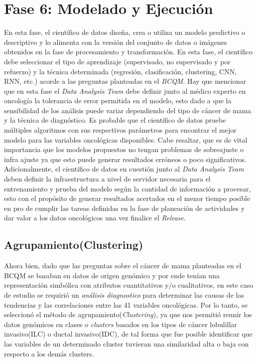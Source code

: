 \clearpage
\section{Fase 6: Modelado y Ejecución}
En esta fase, el científico de datos diseña, crea o utiliza un modelo predictivo o descriptivo y lo alimenta con la versión del conjunto de datos o imágenes obtenidos en la fase de procesamiento y transformación. En esta fase, el científico debe seleccionar el tipo de aprendizaje (supervisado, no supervisado y por refuerzo) y la técnica determinada (regresión, clasificación, clustering, CNN, RNN, etc.) acorde a las preguntas planteadas en el \textit{BCQM}. Hay que mencionar que en esta fase el \textit{Data Analysis Team} debe definir junto al médico experto en oncología la tolerancia de error permitida en el modelo, esto dado a que la sensibilidad de los análisis puede variar dependiendo del tipo de cáncer de mama y la técnica de diagnóstico. Es probable que el científico de datos pruebe múltiples algoritmos con sus respectivos parámetros para encontrar el mejor modelo para las variables oncológicas disponibles. Cabe resaltar, que es de vital importancia que los modelos propuestos no tengan problemas de sobreajuste o infra ajuste ya que esto puede generar resultados erróneos o poco significativos. Adicionalmente, el científico de datos en cuestión junto al \textit{Data Analysis Team} deben definir la infraestructura a nivel de servidor necesaria para el entrenamiento y prueba del modelo según la cantidad de información a procesar, esto con el propósito de generar resultados acertados en el menor tiempo posible en pro de cumplir las tareas definidas en la fase de planeación de actividades y dar valor a los datos oncológicos una vez finalice el \textit{Release}.

\subsection{Agrupamiento(Clustering)}
Ahora bien, dado que las preguntas sobre el cáncer de mama planteadas en el BCQM se basaban en datos de origen genómico y por ende tenían una representación simbólica con atributos cuantitativos y/o cualitativos, en este caso de estudio se requirió un \textit{análisis diagnostico} para determinar las causas de las tendencias y las correlaciones entre las 41 variables oncológicas. Por lo tanto, se seleccionó el método de agrupamiento(\textit{Clustering}), ya que nos permitió reunir los datos genómicos en clases o \textit{clusters} basados en los tipos de cáncer lobulillar invasivo(ILC) o ductal invasivo(IDC), de tal forma que fue posible identificar que las variables de un determinado cluster tuvieran una similaridad alta o baja con respecto a los demás clusters.

